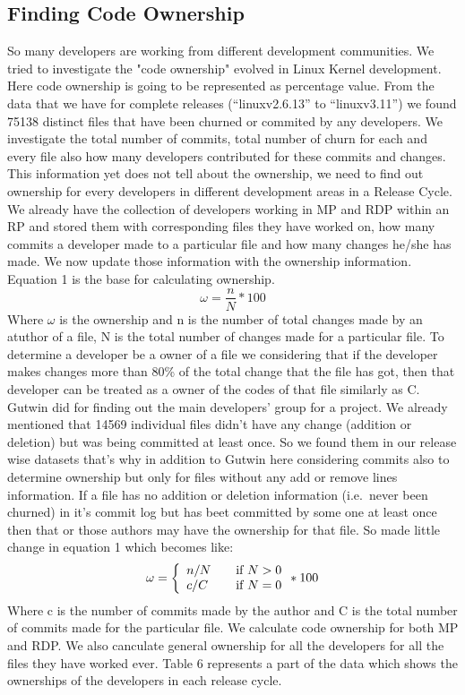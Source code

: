 \documentclass{acm_proc_article-sp}
\begin{document}
\subsection{Finding Code Ownership}
So many developers are working from different development communities. We tried to investigate the "code ownership" \cite{mockus_case_study} evolved in Linux Kernel development. Here code ownership is going to be represented as percentage value. From the data that we have for complete releases (``linuxv2.6.13'' to ``linuxv3.11'') we found 75138 distinct files that have been churned or commited by any developers. We investigate the total number of commits, total number of churn for each and every file also how many developers contributed for these commits and changes. This information yet does not tell about the ownership, we need to find out ownership for every developers in different development areas in a Release Cycle. We already have the collection of developers working in MP and RDP within an RP and stored them with corresponding files they have worked on, how many commits a developer made to a particular file and how many changes he/she has made. We now update those information with the ownership information. Equation 1 is the base for calculating ownership.
\begin{equation}\omega=\frac{n}{N}*100\end{equation}
Where $\omega$ is the ownership and n is the number of total changes made by an atuthor of a file, N is the total number of changes made for a particular file.
To determine a developer be a owner of a file we considering that if the developer makes changes more than 80\% of the total change that the file has got, then that developer can be treated as a owner of the codes of that file similarly as C. Gutwin did \cite{gutwin_awareness} for finding out the main developers' group for a project. We already mentioned that 14569 individual files didn't have any change (addition or deletion) but was being committed at least once. So we found them in our release wise datasets that's why in addition to Gutwin here considering commits also to determine ownership but only for files without any add or remove lines information. If a file has no addition or deletion information (i.e.\ never been churned) in it's commit log but has beet committed by some one at least once then that or those authors may have the ownership for that file. So made little change in equation 1 which becomes like:
\begin{equation} \omega = \left\{ \begin{array}{l l} n/N & \quad \text{if $N > 0$}\\ c/C & \quad \text{if $N = 0$} \end{array} * 100 \right.\end{equation}
Where c is the number of commits made by the author and C is the total number of commits made for the particular file.
We calculate code ownership for both MP and RDP. We also canculate general ownership for all the developers for all the files they have worked ever. Table 6 represents a part of the data which shows the ownerships of the developers in each release cycle.
\end{document}
